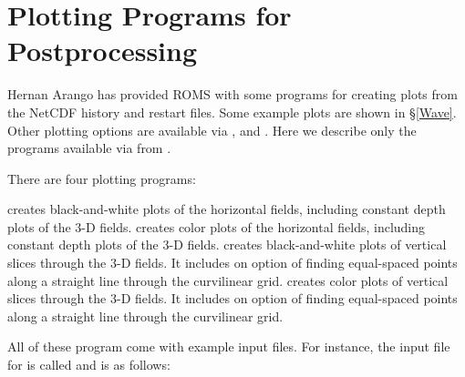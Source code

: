 \section{Plotting Programs for Postprocessing}
\label{Plothist}

Hernan Arango has provided ROMS with some  programs for
creating plots from the NetCDF history and restart files. Some example
plots are shown in \S\ref{Wave}. Other plotting options are available
via ,  and . Here we describe
only the  programs available via  from
.

There are four plotting programs:
\begin{klist}
    creates black-and-white plots of the horizontal fields,
including constant depth plots of the 3-D fields.
    creates color plots of the horizontal fields,
including constant depth plots of the 3-D fields.
    creates black-and-white plots of vertical slices through
the 3-D fields.  It includes on option of finding equal-spaced points
along a straight line through the curvilinear grid.
    creates color plots of vertical slices through
the 3-D fields.  It includes on option of finding equal-spaced points
along a straight line through the curvilinear grid.
\end{klist}
All of these program come with example input files.  For instance, the
input file for  is called  and is as follows:
